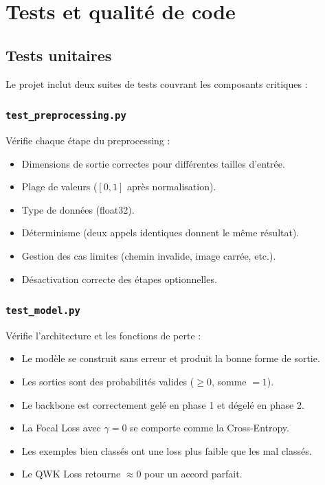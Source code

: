 ﻿\documentclass[11pt,a4paper]{article}
\begin{document}
\section{Tests et qualité de code}

\subsection{Tests unitaires}

Le projet inclut deux suites de tests couvrant les composants critiques :

\subsubsection{\texttt{test\_preprocessing.py}}

Vérifie chaque étape du preprocessing :
\begin{itemize}[leftmargin=2em]
  \item Dimensions de sortie correctes pour différentes tailles d'entrée.
  \item Plage de valeurs ($[0, 1]$ après normalisation).
  \item Type de données (float32).
  \item Déterminisme (deux appels identiques donnent le même résultat).
  \item Gestion des cas limites (chemin invalide, image carrée, etc.).
  \item Désactivation correcte des étapes optionnelles.
\end{itemize}

\subsubsection{\texttt{test\_model.py}}

Vérifie l'architecture et les fonctions de perte :
\begin{itemize}[leftmargin=2em]
  \item Le modèle se construit sans erreur et produit la bonne forme de sortie.
  \item Les sorties sont des probabilités valides ($\geq 0$, somme $= 1$).
  \item Le backbone est correctement gelé en phase 1 et dégelé en phase 2.
  \item La Focal Loss avec $\gamma = 0$ se comporte comme la Cross-Entropy.
  \item Les exemples bien classés ont une loss plus faible que les mal classés.
  \item Le QWK Loss retourne $\approx 0$ pour un accord parfait.
\end{itemize}
\end{document}
